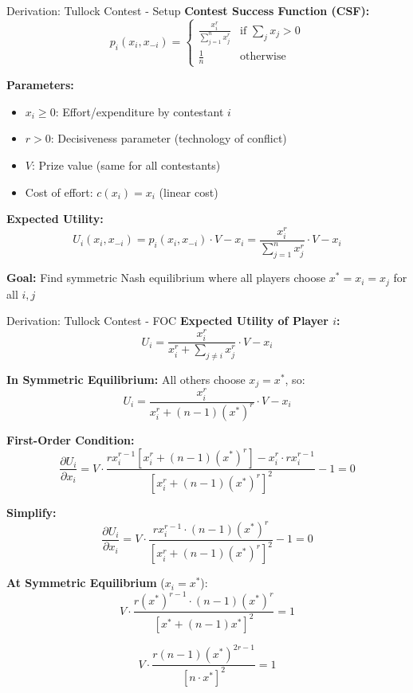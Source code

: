 \documentclass[xcolor={x11names}]{beamer}
\begin{document}
\begin{frame}{Derivation: Tullock Contest - Setup}
\textbf{Contest Success Function (CSF):}
$$p_i(x_i, x_{-i}) = \begin{cases}
\frac{x_i^r}{\sum_{j=1}^n x_j^r} & \text{if } \sum_j x_j > 0 \\
\frac{1}{n} & \text{otherwise}
\end{cases}$$

\textbf{Parameters:}
\begin{itemize}
  \item $x_i \geq 0$: Effort/expenditure by contestant $i$
  \item $r > 0$: Decisiveness parameter (technology of conflict)
  \item $V$: Prize value (same for all contestants)
  \item Cost of effort: $c(x_i) = x_i$ (linear cost)
\end{itemize}

\textbf{Expected Utility:}
$$U_i(x_i, x_{-i}) = p_i(x_i, x_{-i}) \cdot V - x_i = \frac{x_i^r}{\sum_{j=1}^n x_j^r} \cdot V - x_i$$

\textbf{Goal:} Find symmetric Nash equilibrium where all players choose $x^* = x_i = x_j$ for all $i,j$
\end{frame}

\begin{frame}{Derivation: Tullock Contest - FOC}
\textbf{Expected Utility of Player $i$:}
$$U_i = \frac{x_i^r}{x_i^r + \sum_{j \neq i} x_j^r} \cdot V - x_i$$

\textbf{In Symmetric Equilibrium:} All others choose $x_j = x^*$, so:
$$U_i = \frac{x_i^r}{x_i^r + (n-1)(x^*)^r} \cdot V - x_i$$

\textbf{First-Order Condition:}
$$\frac{\partial U_i}{\partial x_i} = V \cdot \frac{r x_i^{r-1}[x_i^r + (n-1)(x^*)^r] - x_i^r \cdot r x_i^{r-1}}{[x_i^r + (n-1)(x^*)^r]^2} - 1 = 0$$

\textbf{Simplify:}
$$\frac{\partial U_i}{\partial x_i} = V \cdot \frac{r x_i^{r-1} \cdot (n-1)(x^*)^r}{[x_i^r + (n-1)(x^*)^r]^2} - 1 = 0$$

\textbf{At Symmetric Equilibrium} ($x_i = x^*$):
$$V \cdot \frac{r (x^*)^{r-1} \cdot (n-1)(x^*)^r}{[x^* + (n-1)x^*]^2} = 1$$

$$V \cdot \frac{r(n-1)(x^*)^{2r-1}}{[n \cdot x^*]^2} = 1$$
\end{frame}
\end{document}
